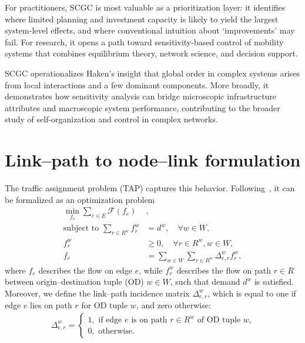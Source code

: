 \documentclass[twocolumn,english,groupedaddress, superscriptaddress,aps,pre,10pt,floatfix]{revtex4-2}
\begin{document}
For practitioners, SCGC is most valuable as a prioritization layer: it identifies where limited planning and investment capacity is likely to yield the largest system-level effects, and where conventional intuition about `improvements' may fail. For research, it opens a path toward sensitivity-based control of mobility systems that combines equilibrium theory, network science, and decision support.

SCGC operationalizes Haken's insight that global order in complex systems arises from local interactions and a few dominant components. More broadly, it demonstrates how sensitivity analysis can bridge microscopic infrastructure attributes and macroscopic system performance, contributing to the broader study of self-organization and control in complex networks.


\newpage
\appendix
\section{Link--path to node--link formulation}\label{app:link-path-node}
The traffic assignment problem (TAP) captures this behavior. Following~\citep{beckmann1956studies, dafermos1969traffic, dafermos1980traffic}, it can be formalized as an optimization problem
\begin{align}\label{eq:app-tap-link-path}
    \min_{{f_e}} \sum_{e \in E} \mathcal{F}(f_e) &, \nonumber \\
   \text{subject to } \sum_{r\in R^w} f_r^w &= d^w, \quad \forall w\in W, \nonumber \\
    f_r^w &\geq 0, \quad \forall r \in R^w, w \in W, \nonumber \\
    f_e &= \sum_{w\in W}\sum_{r\in R^w}\Delta_{e,r}^w f_r^w, 
\end{align}
where $f_e$ describes the flow on edge $e$, while $f_r^w$ describes the flow on path $r \in R$ between origin--destination tuple (OD) $w \in W$, such that demand $d^w$ is satisfied. Moreover, we define the link--path incidence matrix $\Delta^w_{e,r}$, which is equal to one if edge $e$ lies on path $r$ for OD tuple $w$, and zero otherwise:
\begin{align}
\Delta^w_{e,r} = 
    \begin{cases}
        1, \text{ if edge $e$ is on path $r \in R^w$ of OD tuple $w$,}\\
        0, \text{ otherwise.}
    \end{cases}
\end{align}
\end{document}
